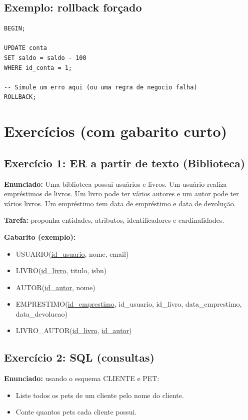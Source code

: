 \documentclass[12pt,a4paper]{article}
\begin{document}
\subsection{Exemplo: rollback forçado}
\begin{lstlisting}[style=sql]
BEGIN;

UPDATE conta
SET saldo = saldo - 100
WHERE id_conta = 1;

-- Simule um erro aqui (ou uma regra de negocio falha)
ROLLBACK;
\end{lstlisting}

\section{Exercícios (com gabarito curto)}

\subsection{Exercício 1: ER a partir de texto (Biblioteca)}
\textbf{Enunciado:} Uma biblioteca possui usuários e livros. Um usuário realiza empréstimos de livros. Um livro pode ter vários autores e um autor pode ter vários livros. Um empréstimo tem data de empréstimo e data de devolução.

\textbf{Tarefa:} proponha entidades, atributos, identificadores e cardinalidades.

\textbf{Gabarito (exemplo):}
\begin{itemize}[leftmargin=*,itemsep=0.2em]
  \item USUARIO(\underline{id\_usuario}, nome, email)
  \item LIVRO(\underline{id\_livro}, titulo, isbn)
  \item AUTOR(\underline{id\_autor}, nome)
  \item EMPRESTIMO(\underline{id\_emprestimo}, id\_usuario, id\_livro, data\_emprestimo, data\_devolucao)
  \item LIVRO\_AUTOR(\underline{id\_livro}, \underline{id\_autor})
\end{itemize}

\subsection{Exercício 2: SQL (consultas)}
\textbf{Enunciado:} usando o esquema CLIENTE e PET:
\begin{itemize}[leftmargin=*,itemsep=0.2em]
  \item Liste todos os pets de um cliente pelo nome do cliente.
  \item Conte quantos pets cada cliente possui.
\end{itemize}
\end{document}
